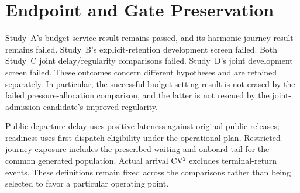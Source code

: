 \section{Endpoint and Gate Preservation}
Study~A's budget-service result remains passed, and its harmonic-journey result remains failed. Study~B's explicit-retention development screen failed. Both Study~C joint delay/regularity comparisons failed. Study~D's joint development screen failed. These outcomes concern different hypotheses and are retained separately. In particular, the successful budget-setting result is not erased by the failed pressure-allocation comparison, and the latter is not rescued by the joint-admission candidate's improved regularity.

Public departure delay uses positive lateness against original public releases; readiness uses first dispatch eligibility under the operational plan. Restricted journey exposure includes the prescribed waiting and onboard tail for the common generated population. Actual arrival CV$^2$ excludes terminal-return events. These definitions remain fixed across the comparisons rather than being selected to favor a particular operating point.

